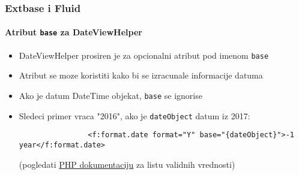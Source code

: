 \begin{frame}[fragile]
	\frametitle{Extbase i Fluid}
	\framesubtitle{Atribut \texttt{base} za DateViewHelper}


	\begin{itemize}

		\item DateViewHelper prosiren je za opcionalni atribut pod imenom \texttt{base}
		\item Atribut se moze koristiti kako bi se izracunale informacije datuma
		\item Ako je datum DateTime objekat, \texttt{base} se ignorise
		\item Sledeci primer vraca "2016", ako je \texttt{dateObject} datum iz 2017:

			\begin{lstlisting}
				<f:format.date format="Y" base="{dateObject}">-1 year</f:format.date>
			\end{lstlisting}

		\small
			(pogledati \href{http://www.php.net/manual/en/datetime.formats.relative.php}{PHP dokumentaciju} za listu validnih vrednosti)
		\normalsize

	\end{itemize}

\end{frame}


